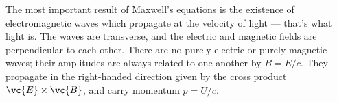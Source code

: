	The most important result of Maxwell's equations is the existence of
	electromagnetic waves which propagate at the velocity of light --- that's
	what light is. The waves are transverse, and the electric and magnetic fields
	are perpendicular to each other. There are no purely electric or purely magnetic
	waves; their amplitudes are always related to one another by $B=E/c$. They propagate
	in the right-handed direction given by the cross product $\vc{E}\times\vc{B}$, and
	carry momentum $p=U/c$.
